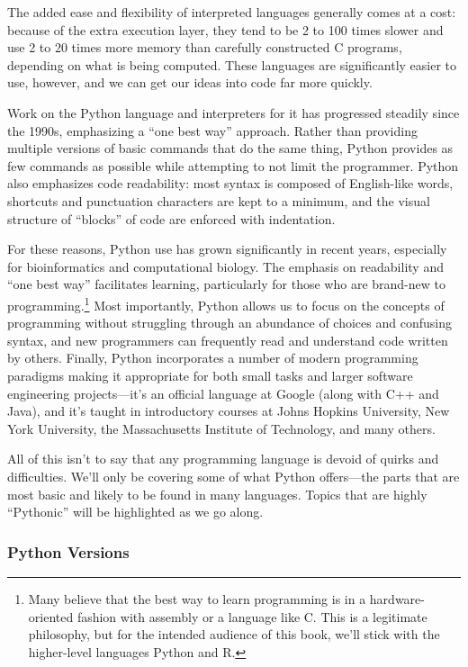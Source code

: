 \documentclass[
]{memoir}
\begin{document}
The added ease and flexibility of interpreted languages generally comes at a cost: because of the extra execution layer, they tend to be 2 to 100 times slower and use 2 to 20 times more memory than carefully constructed C programs, depending on what is being computed. These languages are significantly easier to use, however, and we can get our ideas into code far more quickly.

Work on the Python language and interpreters for it has progressed steadily since the 1990s, emphasizing a \enquote{one best way} approach. Rather than providing multiple versions of basic commands that do the same thing, Python provides as few commands as possible while attempting to not limit the programmer. Python also emphasizes code readability: most syntax is composed of English-like words, shortcuts and punctuation characters are kept to a minimum, and the visual structure of \enquote{blocks} of code are enforced with indentation.

For these reasons, Python use has grown significantly in recent years, especially for bioinformatics and computational biology. The emphasis on readability and \enquote{one best way} facilitates learning, particularly for those who are brand-new to programming.\footnote{Many believe that the best way to learn programming is in a hardware-oriented fashion with assembly or a language like C. This is a legitimate philosophy, but for the intended audience of this book, we'll stick with the higher-level languages Python and R.} Most importantly, Python allows us to focus on the concepts of programming without struggling through an abundance of choices and confusing syntax, and new programmers can frequently read and understand code written by others. Finally, Python incorporates a number of modern programming paradigms making it appropriate for both small tasks and larger software engineering projects---it's an official language at Google (along with C++ and Java), and it's taught in introductory courses at Johns Hopkins University, New York University, the Massachusetts Institute of Technology, and many others.

All of this isn't to say that any programming language is devoid of quirks and difficulties. We'll only be covering some of what Python offers---the parts that are most basic and likely to be found in many languages. Topics that are highly \enquote{Pythonic} will be highlighted as we go along.

\hypertarget{python-versions}{%
\subsubsection*{Python Versions}\label{python-versions}}
\end{document}
